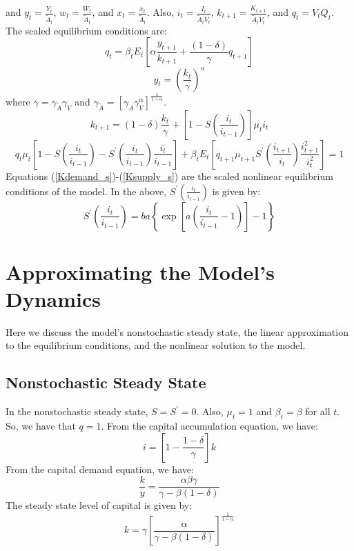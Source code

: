 \documentclass[11pt,fleqn]{article}
\begin{document}
and $y_t = \frac{Y_t}{\tilde{A}_t}$, $w_t = \frac{W_t}{\tilde{A}_t}$, and $x_t = \frac{x_t}{\tilde{A}_t}$.  Also, $i_t = \frac{I_t}{\tilde{A}_t V_t}$, $k_{t+1} = \frac{K_{t+1}}{\tilde{A}_t V_t}$, and $q_t = V_t Q_t$.  The scaled equilibrium conditions are:
\begin{equation}
q_t =  \beta_t E_t  \left[ \alpha \frac{y_{t+1}}{k_{t+1}} + \frac{(1-\delta)}{\gamma} q_{t+1} \right] \label{Kdemand_s}
\end{equation}
\begin{equation}
y_t = \left(\frac{k_t}{\gamma}\right)^{\alpha}
\end{equation}
where $\gamma = \gamma_{\tilde{A}} \gamma_V$ and $\gamma_{\tilde{A}} = \left[ \gamma_A \gamma_V^{\alpha} \right]^{\frac{1}{1-\alpha}}$.  
\begin{equation}
k_{t+1} = (1-\delta) \frac{k_t}{\gamma} + \left[ 1-  S\left(\frac{i_t}{i_{t-1}}\right) \right] \mu_t i_t
\end{equation}
\begin{equation}
q_t \mu_t \left[ 1 - S\left(\frac{i_t}{i_{t-1}}\right)-S^{\prime}\left(\frac{i_t}{i_{t-1}}\right) \frac{i_t}{i_{t-1}} \right]
+ \beta_t E_t \left[ q_{t+1} \mu_{t+1} S^{\prime}\left(\frac{i_{t+1}}{i_{t}}\right)  \frac{ i^2_{t+1}}{i^2_{t}} \right] = 1 \label{Ksupply_s}
\end{equation}
Equations (\ref{Kdemand_s})-(\ref{Ksupply_s}) are the scaled nonlinear equilibrium conditions of the model.  In the above, $S^{\prime}\left(\frac{i_t}{i_{t-1}}\right)$ is given by:
\begin{equation}
S^{\prime}\left(\frac{i_t}{i_{t-1}}\right) = ba \left\{ \exp \left[ a \left(\frac{i_t}{i_{t-1}}-1\right)\right]-1 \right\}
\end{equation}

\section{Approximating the Model's Dynamics}

Here we discuss the model's nonstochastic steady state, the linear approximation to the equilibrium conditions, and the nonlinear solution to the model.  

\subsection{Nonstochastic Steady State}

In the nonstochastic steady state, $S = S^{\prime} = 0$.  Also, $\mu_t = 1$ and $\beta_t = \beta$ for all $t$.  So, we have that $q = 1$.  From the capital accumulation equation, we have:
\begin{equation}
i = \left[ 1-\frac{1-\delta}{\gamma} \right] k
\end{equation}
From the capital demand equation, we have:
\begin{equation}
\frac{k}{y} = \frac{\alpha \beta \gamma}{\gamma-\beta (1-\delta)}
\end{equation}
The steady state level of capital is given by:
\begin{equation}
k = \gamma \left[ \frac{\alpha}{\gamma-\beta (1-\delta)} \right]^{\frac{1}{1-\alpha}}
\end{equation}
\end{document}
